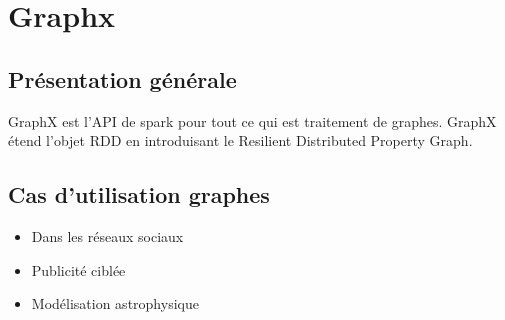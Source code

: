 \section{Graphx}

\subsection{Présentation générale}

GraphX est l'API de spark pour tout ce qui est traitement de graphes. GraphX étend l'objet RDD en introduisant le Resilient Distributed Property Graph.

\subsection{Cas d'utilisation graphes}

\begin{itemize}
      \item Dans les réseaux sociaux
      \item Publicité ciblée
      \item Modélisation astrophysique
\end{itemize}
